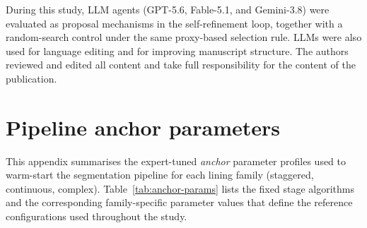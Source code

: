 \documentclass[a4paper,fleqn]{cas-dc}
\begin{document}
During this study, LLM agents (GPT-5.6, Fable-5.1, and Gemini-3.8) were evaluated as proposal mechanisms in the self-refinement loop, together with a random-search control under the same proxy-based selection rule. LLMs were also used for language editing and for improving manuscript structure. The authors reviewed and edited all content and take full responsibility for the content of the publication.







\appendix

\section{Pipeline anchor parameters}\label{app:anchor-parameter}

This appendix summarises the expert-tuned \emph{anchor} parameter profiles used to warm-start the segmentation pipeline for each lining family (staggered, continuous, complex). Table~\ref{tab:anchor-params} lists the fixed stage algorithms and the corresponding family-specific parameter values that define the reference configurations used throughout the study.
\end{document}
